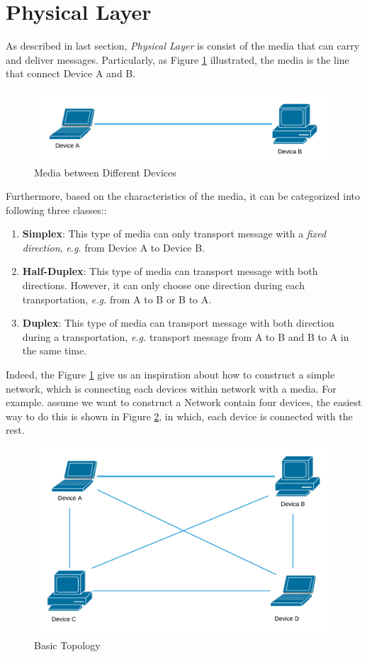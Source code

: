 \documentclass[10pt,a4paper]{article}
\begin{document}
\section{Physical Layer}
As described in last section, \textit{Physical Layer} is consist of the media that can carry and deliver messages. Particularly, as Figure \ref{physical_layer} illustrated, the media is the line that connect Device A and B. 
\begin{figure}[ht]
	\center
	\includegraphics[scale=0.85]{Physical}
	\caption{Media between Different Devices}
	\label{physical_layer}
\end{figure}
Furthermore, based on the characteristics of the media, it can be categorized into following three classes::
\begin{enumerate}
	\item \textbf{Simplex}: This type of media can only transport message with a \textit{fixed direction}, \textsl{e.g.} from Device A to Device B.
	\item \textbf{Half-Duplex}: This type of media can transport message with both directions. However, it can only choose one direction during each transportation, \textsl{e.g.} from A to B or B to A.
	\item \textbf{Duplex}: This type of media can transport message with both direction during a transportation, \textsl{e.g.} transport message from A to B and B to A in the same time.
\end{enumerate}
Indeed, the Figure \ref{physical_layer} give us an inspiration about how to construct a simple network, which is connecting each devices within network with a media. For example. assume we want to construct a Network contain four devices, the easiest way to do this is shown in Figure \ref{topology_basic}, in which, each device is connected with the rest.
\begin{figure}[ht]
	\center
	\includegraphics[scale=0.5]{Topology}
	\caption{Basic Topology}
	\label{topology_basic}
\end{figure}
\end{document}
